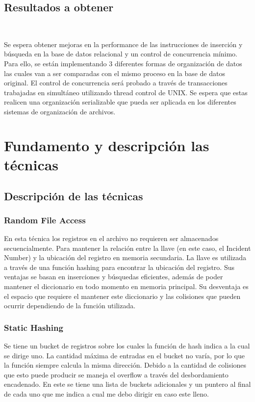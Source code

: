\documentclass{article}
\begin{document}
    \subsection{Resultados a obtener} 

      Se espera obtener mejoras en la performance de las instrucciones de inserción y búsqueda en la base de datos relacional y un control de concurrencia mínimo. Para ello, se están implementando 3 diferentes formas de organización de datos las cuales van a ser comparadas con el mismo proceso en la base de datos original. El control de concurrencia será probado a través de transacciones trabajadas en simultáneo utilizando thread control de UNIX. Se espera que estas realicen una organización serializable que pueda ser aplicada en los diferentes sistemas de organización de archivos.

  \section{Fundamento y descripción las técnicas} 

    \subsection{Descripción de las técnicas}

      \subsubsection{Random File Access}

        En esta técnica los registros en el archivo no requieren ser almacenados secuencialmente. Para mantener la relación entre la llave (en este caso, el Incident Number) y la ubicación del registro en memoria secundaria. La llave es utilizada a través de una función hashing para encontrar la ubicación del registro. Sus ventajas se basan en inserciones y búsquedas eficientes, además de poder mantener el diccionario en todo momento en memoria principal. Su desventaja es el espacio que requiere el mantener este diccionario y las colisiones que pueden ocurrir dependiendo de la función utilizada.

      \subsubsection{Static Hashing}
        
        Se tiene un bucket de registros sobre los cuales la función de hash indica a la cual se dirige uno. La cantidad máxima de entradas en el bucket no varía, por lo que la función siempre calcula la misma dirección. Debido a la cantidad de colisiones que esto puede producir se maneja el overflow a través del desbordamiento encadenado. En este se tiene una lista de buckets adicionales y un puntero al final de cada uno que me indica a cual me debo dirigir en caso este lleno.
\end{document}
